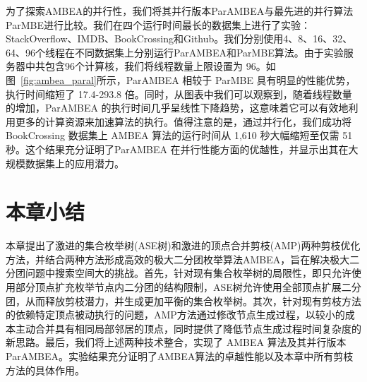 为了探索AMBEA的并行性，我们将其并行版本ParAMBEA与最先进的并行算法ParMBE进行比较。我们在四个运行时间最长的数据集上进行了实验：StackOverflow、IMDB、BookCrossing和Github。我们分别使用4、8、16、32、64、96个线程在不同数据集上分别运行ParAMBEA和ParMBE算法。由于实验服务器中共包含96个计算核，我们将线程数量上限设置为 96。如图~\ref{fig:ambea_paral}所示，ParAMBEA 相较于 ParMBE 具有明显的性能优势，执行时间缩短了 17.4-293.8 倍。同时，从图表中我们可以观察到，随着线程数量的增加，ParAMBEA 的执行时间几乎呈线性下降趋势，这意味着它可以有效地利用更多的计算资源来加速算法的执行。值得注意的是，通过并行化，我们成功将 BookCrossing 数据集上 AMBEA 算法的运行时间从 1,610 秒大幅缩短至仅需 51 秒。这个结果充分证明了ParAMBEA 在并行性能方面的优越性，并显示出其在大规模数据集上的应用潜力。

\section{本章小结}

本章提出了激进的集合枚举树(ASE树)和激进的顶点合并剪枝(AMP)两种剪枝优化方法，并结合两种方法形成高效的极大二分团枚举算法AMBEA，旨在解决极大二分团问题中搜索空间大的挑战。首先，针对现有集合枚举树的局限性，即只允许使用部分顶点扩充枚举节点内二分团的结构限制，ASE树允许使用全部顶点扩展二分团，从而释放剪枝潜力，并生成更加平衡的集合枚举树。其次，针对现有剪枝方法的依赖特定顶点被动执行的问题，AMP方法通过修改节点生成过程，以较小的成本主动合并具有相同局部邻居的顶点，同时提供了降低节点生成过程时间复杂度的新思路。最后，我们将上述两种技术整合，实现了 AMBEA 算法及其并行版本 ParAMBEA。实验结果充分证明了AMBEA算法的卓越性能以及本章中所有剪枝方法的具体作用。
